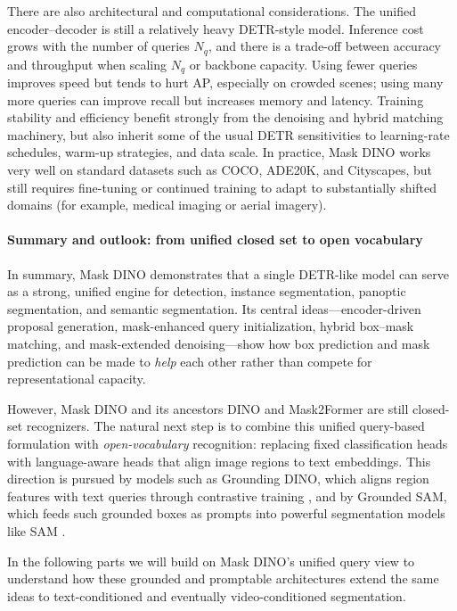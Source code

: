 \begin{enrichment}
\begin{enrichment}
		There are also architectural and computational considerations. The unified encoder–decoder is still a relatively heavy DETR-style model. Inference cost grows with the number of queries \(N_q\), and there is a trade-off between accuracy and throughput when scaling \(N_q\) or backbone capacity. Using fewer queries improves speed but tends to hurt AP, especially on crowded scenes; using many more queries can improve recall but increases memory and latency. Training stability and efficiency benefit strongly from the denoising and hybrid matching machinery, but also inherit some of the usual DETR sensitivities to learning-rate schedules, warm-up strategies, and data scale. In practice, Mask DINO works very well on standard datasets such as COCO, ADE20K, and Cityscapes, but still requires fine-tuning or continued training to adapt to substantially shifted domains (for example, medical imaging or aerial imagery).
		
		\paragraph{Summary and outlook: from unified closed set to open vocabulary}
		
		In summary, Mask DINO demonstrates that a single DETR-like model can serve as a strong, unified engine for detection, instance segmentation, panoptic segmentation, and semantic segmentation. Its central ideas—encoder-driven proposal generation, mask-enhanced query initialization, hybrid box–mask matching, and mask-extended denoising—show how box prediction and mask prediction can be made to \emph{help} each other rather than compete for representational capacity.
		
		However, Mask DINO and its ancestors DINO and Mask2Former are still closed-set recognizers. The natural next step is to combine this unified query-based formulation with \emph{open-vocabulary} recognition: replacing fixed classification heads with language-aware heads that align image regions to text embeddings. This direction is pursued by models such as Grounding DINO, which aligns region features with text queries through contrastive training \cite{liu2023_groundingdino}, and by Grounded SAM, which feeds such grounded boxes as prompts into powerful segmentation models like SAM \cite{ren2024_groundedsam,kirillov2023_sam}.
		
		\newpage
		
		In the following parts we will build on Mask DINO’s unified query view to understand how these grounded and promptable architectures extend the same ideas to text-conditioned and eventually video-conditioned segmentation.
		

\end{enrichment}
\end{enrichment}
